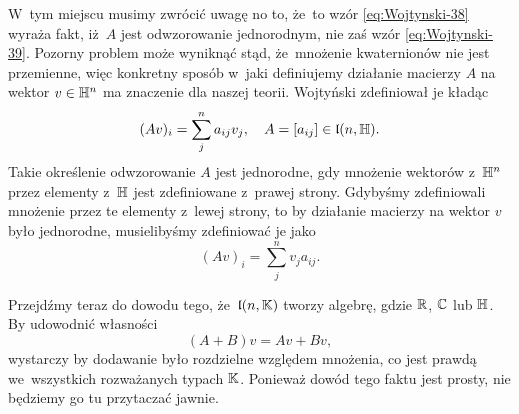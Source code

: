 \documentclass[a4paper,11pt]{article}
\begin{document}
W~tym miejscu musimy zwrócić uwagę no to, że~to wzór \eqref{eq:Wojtynski-38}
wyraża fakt, iż~$A$ jest odwzorowanie jednorodnym, nie zaś wzór
\eqref{eq:Wojtynski-39}. Pozorny problem może wyniknąć stąd, że~mnożenie
kwaternionów nie jest przemienne, więc konkretny sposób w~jaki definiujemy
działanie macierzy $A$ na wektor $v \in \mathbb{H}^{ n }$ ma znaczenie dla naszej
teorii. Wojtyński zdefiniował je kładąc
\begin{equation}
  \label{eq:Wojtynski-41}
  ( A v )_{ i } = \sum_{ j }^{ n } a_{ i j } v_{ j }, \quad
  A = [ a_{ ij } ] \in \mathfrak{l}( n, \mathbb{H} ).
\end{equation}
Takie określenie odwzorowanie $A$ jest jednorodne, gdy mnożenie wektorów
z~$\mathbb{H}^{ n }$ przez elementy z~$\mathbb{H}$ jest zdefiniowane z~prawej strony.
Gdybyśmy zdefiniowali mnożenie przez te elementy z~lewej strony, to
by działanie macierzy na wektor $v$ było jednorodne, musielibyśmy
zdefiniować je jako
\begin{equation}
  \label{eq:Wojtynski-42}
  ( A v )_{ i } = \sum_{ j }^{ n } v_{ j } a_{ i j }.
\end{equation}

Przejdźmy teraz do dowodu tego, że~$\mathfrak{l}( n, \mathbb{K} )$ tworzy algebrę,
gdzie $\mathbb{R}$, $\mathbb{C}$ lub $\mathbb{H}$. By udowodnić własności
\begin{equation}
  \label{eq:Wojtynski-43}
  ( A + B ) v = A v + B v,
\end{equation}
wystarczy by dodawanie było rozdzielne względem mnożenia, co jest prawdą
we~wszystkich rozważanych typach $\mathbb{K}$. Ponieważ dowód tego faktu jest
prosty, nie będziemy go tu przytaczać jawnie.

\vspace{\spaceFour}














\newpage

\end{document}
